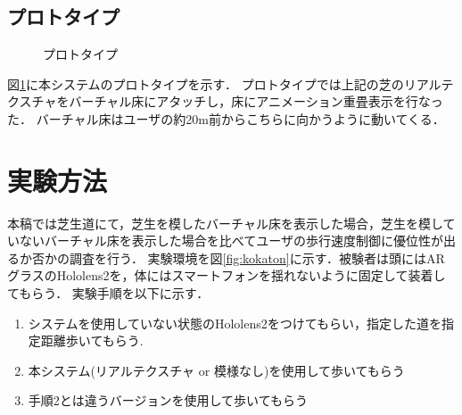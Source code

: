 \documentclass[dvipdfmx]{jsarticle}
\begin{document}
\subsection{プロトタイプ}
\begin{figure}[t]
    \centering
    \caption{プロトタイプ}
    \label{fig:puroto}
\end{figure}
図\ref{fig:puroto}に本システムのプロトタイプを示す．
プロトタイプでは上記の芝のリアルテクスチャをバーチャル床にアタッチし，床にアニメーション重畳表示を行なった．
バーチャル床はユーザの約20m前からこちらに向かうように動いてくる．
\section{実験方法}

本稿では芝生道にて，芝生を模したバーチャル床を表示した場合，芝生を模していないバーチャル床を表示した場合を比べてユーザの歩行速度制御に優位性が出るか否かの調査を行う．
実験環境を図\ref{fig:kokaton}に示す．被験者は頭にはARグラスのHololens2を，体にはスマートフォンを揺れないように固定して装着してもらう．
実験手順を以下に示す．
\begin{enumerate}
    \item システムを使用していない状態のHololens2をつけてもらい，指定した道を指定距離歩いてもらう.
    \item 本システム(リアルテクスチャ or 模様なし)を使用して歩いてもらう
    \item 手順2とは違うバージョンを使用して歩いてもらう
\end{enumerate}
\end{document}
